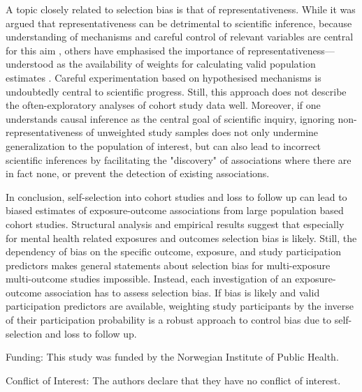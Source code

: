 \documentclass[12pt]{article}
\begin{document}
A topic closely related to selection bias is that of representativeness. While it was argued that representativeness can be detrimental to scientific inference, because understanding of mechanisms and careful control of relevant variables are central for this aim \cite{Rothman2013-qc}, others have emphasised the importance of representativeness---understood as the availability of weights for calculating valid population estimates \cite{Keiding2016-fv}. Careful experimentation based on hypothesised mechanisms is undoubtedly central to scientific progress. Still, this approach does not describe the often-exploratory analyses of cohort study data well. Moreover, if one understands causal inference as the central goal of scientific inquiry, ignoring non-representativeness of unweighted study samples does not only undermine generalization to the population of interest, but can also lead to incorrect scientific inferences by facilitating the "discovery" of associations where there are in fact none, or prevent the detection of existing associations.

In conclusion, self-selection into cohort studies and loss to follow up can lead to biased estimates of exposure-outcome associations from large population based cohort studies. Structural analysis and empirical results suggest that especially for mental health related exposures and outcomes selection bias is likely. Still, the dependency of bias on the specific outcome, exposure, and study participation predictors makes general statements about selection bias for multi-exposure multi-outcome studies impossible. Instead, each  investigation of an exposure-outcome association has to assess selection bias. If bias is likely and valid participation predictors are available, weighting study participants by the inverse of their participation probability is a robust approach to control bias due to self-selection and loss to follow up.


Funding: This study was funded by the Norwegian Institute of Public Health.


Conflict of Interest: The authors declare that they have no conflict of interest.


\newpage

\printbibliography

\newpage

\processdelayedfloats

\clearpage

\makeatletter
\efloat@restorefloats
\makeatother

\appendix
\end{document}
